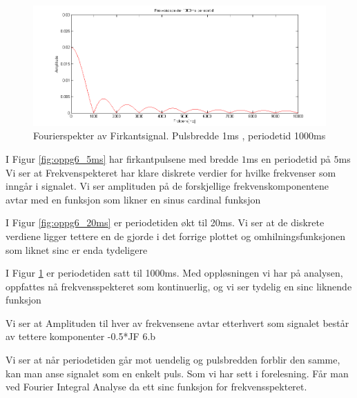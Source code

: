 \documentclass[norsk, a4paper]{article}
\makeatletter
\renewcommand{\subsubsection}{\@startsection{subsubsection}{3}{-2cm}%
{-\baselineskip}{0.5\baselineskip}{\bf\large}}
\newcommand{\jf}[1]{\subsubsection*{JF #1}\vspace*{-2\baselineskip}}
\makeatother
\begin{document}
\begin{figure}
  \begin{center}
      \includegraphics[width= 1\textwidth]{Figurer/oppg6_1000ms.png}
       \caption{Fourierspekter av Firkantsignal. Pulsbredde 1ms , periodetid 1000ms}\label{fig:oppg6_1000ms}
  \end{center}
\end{figure}

I Figur \ref{fig:oppg6_5ms} har firkantpulsene med bredde \(1\)ms en periodetid på \(5\)ms Vi ser at Frekvenspekteret har klare diskrete verdier for hvilke frekvenser som inngår i signalet. Vi ser amplituden på de forskjellige frekvenskomponentene avtar med en funksjon som likner en sinus cardinal funksjon

I Figur \ref{fig:oppg6_20ms} er periodetiden økt til 20ms. Vi ser at de diskrete verdiene ligger tettere en de gjorde i det forrige plottet og omhilningsfunksjonen som liknet sinc er enda tydeligere

I Figur \ref{fig:oppg6_1000ms} er periodetiden satt til 1000ms. Med oppløsningen vi har på analysen, oppfattes nå frekvensspekteret som kontinuerlig, og vi ser tydelig en sinc liknende funksjon

Vi ser at Amplituden til hver av frekvensene avtar etterhvert som signalet består av tettere komponenter 
\jf{6.b}

Vi ser at når periodetiden går mot uendelig og pulsbredden forblir den samme, kan man anse signalet som en enkelt puls. Som vi har sett i forelesning. Får man ved Fourier Integral Analyse da ett sinc funksjon for frekvensspekteret. 
\end{document}
